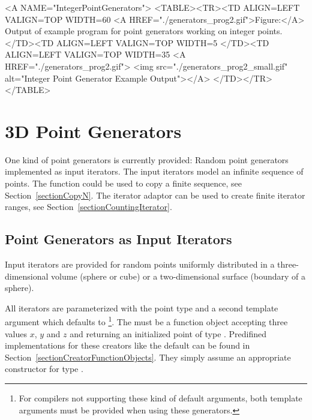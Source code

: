
\begin{ccHtmlOnly}
  <A NAME="IntegerPointGenerators">
  <TABLE><TR><TD ALIGN=LEFT VALIGN=TOP WIDTH=60%
    <A HREF="./generators_prog2.gif">Figure:</A>
        Output of example program for point generators working
        on integer points.
  </TD><TD ALIGN=LEFT VALIGN=TOP WIDTH=5%
  </TD><TD ALIGN=LEFT VALIGN=TOP WIDTH=35%
    <A HREF="./generators_prog2.gif">
        <img src="./generators_prog2_small.gif" 
             alt="Integer Point Generator Example Output"></A>
  </TD></TR></TABLE>
\end{ccHtmlOnly}


\newpage
\section{3D Point Generators}

One kind of point generators is currently provided: Random point
generators implemented as input iterators.  The input iterators model
an infinite sequence of points. The function  could
be used to copy a finite sequence, see Section~\ref{sectionCopyN}. The
iterator adaptor  can be used to create
finite iterator ranges, see Section~\ref{sectionCountingIterator}.


\subsection{Point Generators as Input Iterators}

\ccDefinition

Input iterators are provided for random points uniformly distributed
in a three-dimensional volume (sphere or cube) or a two-dimensional
surface (boundary of a sphere).

All iterators are parameterized with the point type  and a second
template argument  which defaults to
\footnote{%
  For compilers not supporting these kind of default arguments, both
  template arguments must be provided when using these generators.}.
The  must be a function object accepting three
 values $x$, $y$ and $z$ and returning an initialized
point  of type . Predifined implementations for
these creators like the default can be found in
Section~\ref{sectionCreatorFunctionObjects}.  They simply assume an
appropriate constructor for type .

